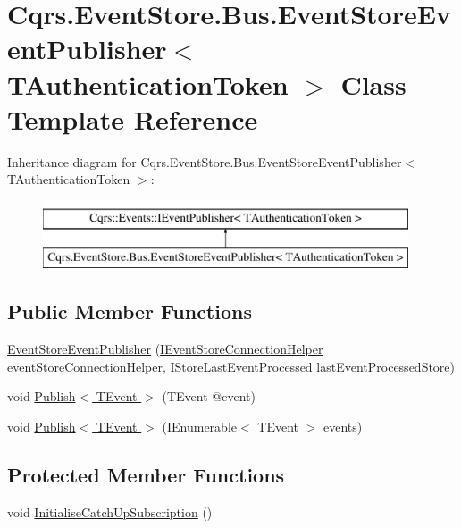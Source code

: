 \hypertarget{classCqrs_1_1EventStore_1_1Bus_1_1EventStoreEventPublisher}{}\section{Cqrs.\+Event\+Store.\+Bus.\+Event\+Store\+Event\+Publisher$<$ T\+Authentication\+Token $>$ Class Template Reference}
\label{classCqrs_1_1EventStore_1_1Bus_1_1EventStoreEventPublisher}
Inheritance diagram for Cqrs.\+Event\+Store.\+Bus.\+Event\+Store\+Event\+Publisher$<$ T\+Authentication\+Token $>$\+:\begin{figure}[H]
\begin{center}
\leavevmode
\includegraphics[height=2.000000cm]{classCqrs_1_1EventStore_1_1Bus_1_1EventStoreEventPublisher}
\end{center}
\end{figure}
\subsection*{Public Member Functions}
\begin{DoxyCompactItemize}
\item 
\hyperlink{classCqrs_1_1EventStore_1_1Bus_1_1EventStoreEventPublisher_a4ca16479fe387fae0135865ae3f889d7}{Event\+Store\+Event\+Publisher} (\hyperlink{interfaceCqrs_1_1EventStore_1_1IEventStoreConnectionHelper}{I\+Event\+Store\+Connection\+Helper} event\+Store\+Connection\+Helper, \hyperlink{interfaceCqrs_1_1Bus_1_1IStoreLastEventProcessed}{I\+Store\+Last\+Event\+Processed} last\+Event\+Processed\+Store)
\item 
void \hyperlink{classCqrs_1_1EventStore_1_1Bus_1_1EventStoreEventPublisher_a1ebb6f08648bdfd5c5bd29fcc12adfea}{Publish$<$ T\+Event $>$} (T\+Event @event)
\item 
void \hyperlink{classCqrs_1_1EventStore_1_1Bus_1_1EventStoreEventPublisher_a85b4922ff01b088b01b39463681c6eb6}{Publish$<$ T\+Event $>$} (I\+Enumerable$<$ T\+Event $>$ events)
\end{DoxyCompactItemize}
\subsection*{Protected Member Functions}
\begin{DoxyCompactItemize}
\item 
void \hyperlink{classCqrs_1_1EventStore_1_1Bus_1_1EventStoreEventPublisher_a145dd61678031747b4c1768e68937181}{Initialise\+Catch\+Up\+Subscription} ()
\end{DoxyCompactItemize}
